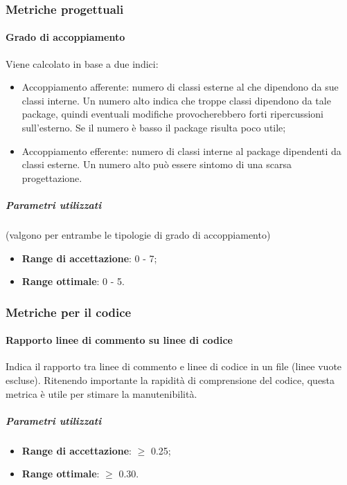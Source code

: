 \documentclass[../PianoDiQualifica.tex]{subfiles}
\begin{document}
			\subsubsection{Metriche progettuali}\label{MetricheProgettuali}
				\paragraph{Grado di accoppiamento\\}
					Viene calcolato in base a due indici:
					\begin{itemize}
						\item Accoppiamento afferente: numero di classi esterne
						al  che dipendono da sue classi interne. Un numero
						alto indica che troppe classi dipendono da tale package, quindi
						eventuali modifiche provocherebbero forti ripercussioni
						sull'esterno. Se il numero è basso il package risulta poco
						utile;
						\item Accoppiamento efferente: numero di classi interne
						al package dipendenti da classi esterne. Un numero alto può
						essere sintomo di una scarsa progettazione.
					\end{itemize}
					\subparagraph{Parametri utilizzati}
						(valgono per entrambe le tipologie di grado di accoppiamento)
						\begin{itemize}
							\item \textbf{Range di accettazione}: 0 - 7;
							\item \textbf{Range ottimale}: 0 - 5.
						\end{itemize}
			\subsubsection{Metriche per il codice}\label{MetrichePerIlCodice}
				\paragraph{Rapporto linee di commento su linee di codice\\}
					Indica il rapporto tra linee di commento e linee di codice in un
					file (linee vuote escluse). Ritenendo importante la rapidità di
					comprensione del codice, questa metrica è utile per stimare la
					manutenibilità.
					\subparagraph{Parametri utilizzati}
						\begin{itemize}
							\item \textbf{Range di accettazione}: $\geq$ 0.25;
							\item \textbf{Range ottimale}: $\geq$ 0.30.
						\end{itemize}
\end{document}
